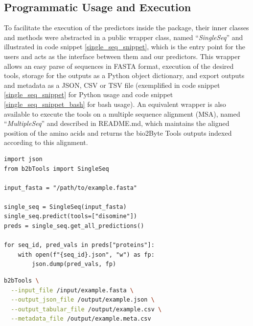 \subsection{Programmatic Usage and Execution}

To facilitate the execution of the predictors inside the package, their inner classes and methods were abstracted in a public wrapper class, named ``\textit{SingleSeq}'' and illustrated in code snippet \ref{single_seq_snippet}, which is the entry point for the users and acts as the interface between them and our predictors. This wrapper allows an easy parse of sequences in FASTA format, execution of the desired tools, storage for the outputs as a Python object dictionary, and export outputs and metadata as a JSON, CSV or TSV file (exemplified in code snippet \ref{single_seq_snippet} for Python usage and code snippet \ref{single_seq_snippet_bash} for bash usage). An equivalent wrapper is also available to execute the tools on a multiple sequence alignment (MSA), named ``\textit{MultipleSeq}'' and described in README.md, which maintains the aligned position of the amino acids and returns the bio2Byte Tools outputs indexed according to this alignment.


\begin{lstlisting}[caption={\textbf{Python execution of bio2Byte Tools.} This code will store for each individual sequence contained in \textit{example.fasta} a \textit{.json} output file with the predictions of the selected tools and their dependencies.}, label={single_seq_snippet}, float] 
import json
from b2bTools import SingleSeq

input_fasta = "/path/to/example.fasta"

single_seq = SingleSeq(input_fasta)
single_seq.predict(tools=["disomine"])
preds = single_seq.get_all_predictions()

for seq_id, pred_vals in preds["proteins"]:
    with open(f"{seq_id}.json", "w") as fp:
        json.dump(pred_vals, fp)
\end{lstlisting}

\begin{lstlisting}[language=bash, caption={\textbf{Bash execution of bio2Byte Tools.} This code will store the output of all sequences in the \textit{.fasta} input in \textit{.json} and \textit{.csv} files and will also store the metadata in a different file.}, label={single_seq_snippet_bash}, float] 
b2bTools \
  --input_file /input/example.fasta \
  --output_json_file /output/example.json \
  --output_tabular_file /output/example.csv \
  --metadata_file /output/example.meta.csv
\end{lstlisting}

